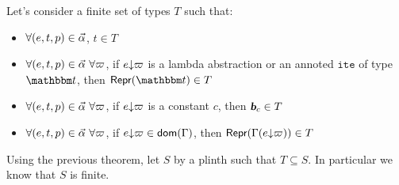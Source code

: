 \documentclass[a4paper]{article}
\theoremstyle{definition}
\begin{document}
%
%
%
%

    Let's consider a finite set of types $T$ such that:
    \begin{itemize}
      \item $\forall (e,t,p) \in \vec \alpha$, $t \in T$
      \item $\forall (e,t,p) \in \vec \alpha\ \forall \varpi$, if $e{\downarrow}\varpi$ is a lambda abstraction or an annoted $\texttt{ite}$ of type $\ts$, then $\tsrep{\ts} \in T$
      \item $\forall (e,t,p) \in \vec \alpha\ \forall \varpi$, if $e{\downarrow}\varpi$ is a constant $c$, then $\basic{c} \in T$
      \item $\forall (e,t,p) \in \vec \alpha\ \forall \varpi$, if $e{\downarrow}\varpi \in \textsf{dom}(\Gamma)$, then $\textsf{Repr}(\Gamma(e{\downarrow}\varpi)) \in T$
    \end{itemize}

    Using the previous theorem, let $S$ by a plinth such that $T \subseteq S$. In particular we know that $S$ is finite.
\end{document}
